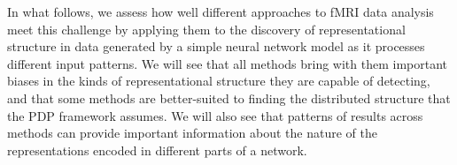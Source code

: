 In what follows, we assess how well different approaches to fMRI data analysis meet this challenge by applying them to the discovery of representational structure in data generated by a simple neural network model as it processes different input patterns. We will see that all methods bring with them important biases in the kinds of representational structure they are capable of detecting, and that some methods are better-suited to finding the distributed structure that the PDP framework assumes. We will also see that patterns of results across methods can provide important information about the nature of the representations encoded in different parts of a network.